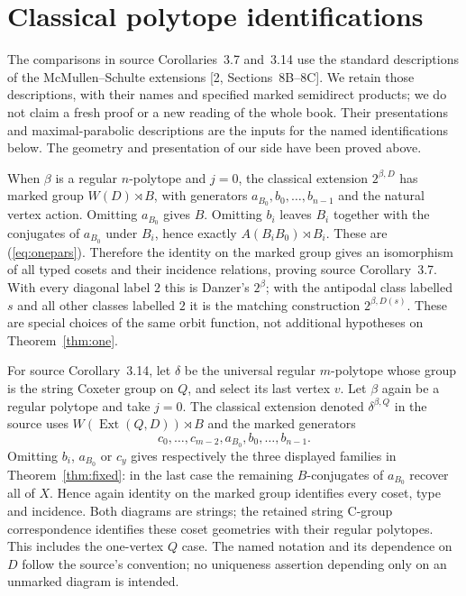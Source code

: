 \section{Classical polytope identifications}
The comparisons in source Corollaries~3.7 and~3.14 use the standard descriptions of the McMullen--Schulte extensions [2, Sections~8B--8C]. We retain those descriptions, with their names and specified marked semidirect products; we do not claim a fresh proof or a new reading of the whole book. Their presentations and maximal-parabolic descriptions are the inputs for the named identifications below. The geometry and presentation of our side have been proved above.

When $\beta$ is a regular $n$-polytope and $j=0$, the classical extension $2^{\beta,D}$ has marked group $W(D)\rtimes B$, with generators $a_{B_0},b_0,\ldots,b_{n-1}$ and the natural vertex action. Omitting $a_{B_0}$ gives $B$. Omitting $b_i$ leaves $B_i$ together with the conjugates of $a_{B_0}$ under $B_i$, hence exactly $A(B_iB_0)\rtimes B_i$. These are (\ref{eq:onepars}). Therefore the identity on the marked group gives an isomorphism of all typed cosets and their incidence relations, proving source Corollary~3.7. With every diagonal label $2$ this is Danzer's $2^\beta$; with the antipodal class labelled $s$ and all other classes labelled $2$ it is the matching construction $2^{\beta,D(s)}$. These are special choices of the same orbit function, not additional hypotheses on Theorem~\ref{thm:one}.

For source Corollary~3.14, let $\delta$ be the universal regular $m$-polytope whose group is the string Coxeter group on $Q$, and select its last vertex $v$. Let $\beta$ again be a regular polytope and take $j=0$. The classical extension denoted $\delta^{\beta,Q}$ in the source uses $W(\operatorname{Ext}(Q,D))\rtimes B$ and the marked generators
\[
c_0,\ldots,c_{m-2},a_{B_0},b_0,\ldots,b_{n-1}.
\]
Omitting $b_i$, $a_{B_0}$ or $c_y$ gives respectively the three displayed families in Theorem~\ref{thm:fixed}: in the last case the remaining $B$-conjugates of $a_{B_0}$ recover all of $X$. Hence again identity on the marked group identifies every coset, type and incidence. Both diagrams are strings; the retained string C-group correspondence identifies these coset geometries with their regular polytopes. This includes the one-vertex $Q$ case. The named notation and its dependence on $D$ follow the source's convention; no uniqueness assertion depending only on an unmarked diagram is intended.

